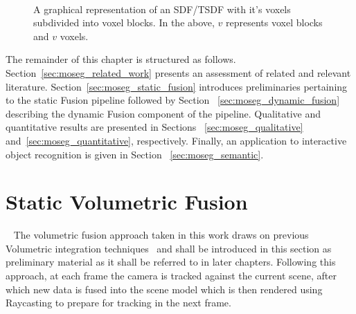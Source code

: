 \begin{figure}[!htbp]
{
  }
  \caption[TSDF split in to voxel blocks]{A graphical representation of an 
  SDF/TSDF with it's voxels subdivided into voxel blocks. In the above, \(v\) 
  represents voxel blocks and \(v\) voxels.}
~\label{figure:voxel_blocks}
\end{figure}

The remainder of this chapter is structured as follows.
Section~\ref{sec:moseg_related_work} presents an assessment of related and
relevant literature. Section~\ref{sec:moseg_static_fusion} introduces
preliminaries pertaining to the static Fusion pipeline followed by Section
~\ref{sec:moseg_dynamic_fusion} describing the dynamic Fusion component of the
pipeline. Qualitative and quantitative results are presented in Sections
~\ref{sec:moseg_qualitative} and~\ref{sec:moseg_quantitative}, respectively.
Finally, an application to interactive object recognition is given in Section
~\ref{sec:moseg_semantic}.

\section{Static Volumetric Fusion}
~\label{sec:moseg_static_fusion}
The volumetric fusion approach taken in this work draws on previous Volumetric
integration techniques~\cite{Curless1996, Newcombe2011, NieBner2013, Prisacariu2014} 
and shall be introduced in this section as preliminary material as it shall be
referred to in later chapters. Following this approach, at each frame the camera
is tracked against the current scene, after which new data is fused into the
scene model which is then rendered using Raycasting to prepare for tracking in
the next frame.

